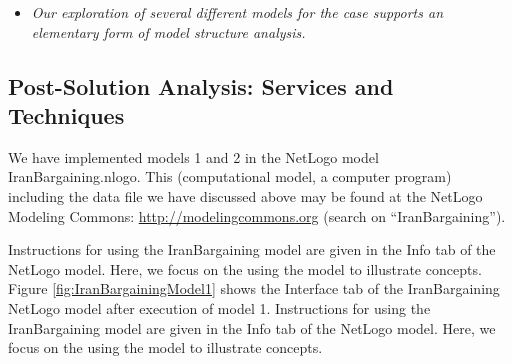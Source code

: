 \begin{itemize}
\item {\it Our exploration of several different models for the case supports an elementary form of model structure analysis.}
\end{itemize}


\subsection{Post-Solution Analysis: Services and Techniques\label{sec:post_solution_analysis_services}}



We have implemented models 1 and 2 in the NetLogo model IranBargaining.nlogo. This (computational model, a computer program) including the data file  we have discussed above may be found at the NetLogo Modeling Commons:
\url{http://modelingcommons.org} (search on ``IranBargaining'').


Instructions for using the IranBargaining model are given in the Info tab of the NetLogo model. Here, we focus on the using the model to illustrate concepts.
Figure \ref{fig:IranBargainingModel1} shows the Interface tab of the IranBargaining NetLogo model after execution of model 1. Instructions for using the IranBargaining model are given in the Info tab of the NetLogo model. Here, we focus on the using the model to illustrate concepts.




